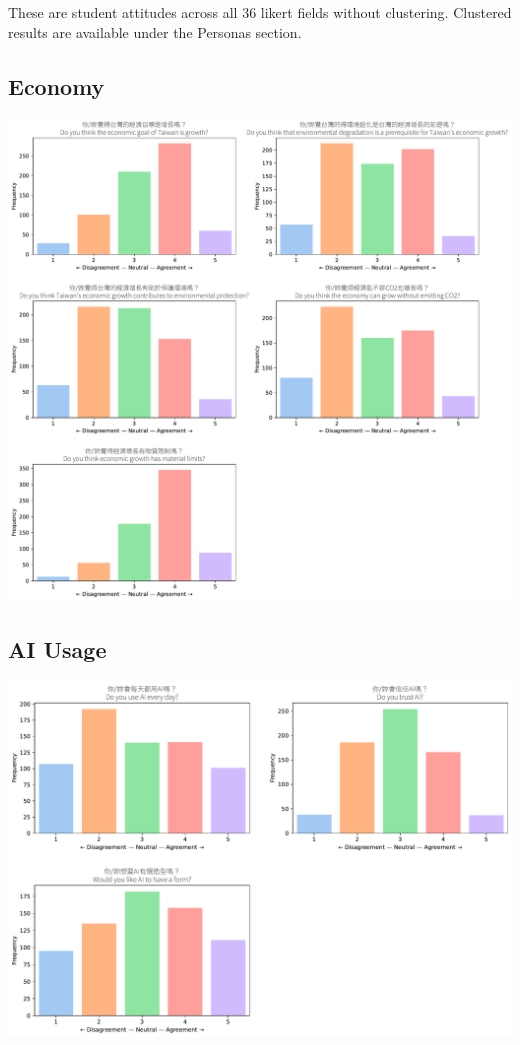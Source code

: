 \documentclass[
  letterpaper,
  DIV=11,
  numbers=noendperiod]{scrartcl}
\begin{document}
These are student attitudes across all 36 likert fields without
clustering. Clustered results are available under the Personas section.

\subsection{Economy}\label{economy}

\includegraphics{_thesis_files/figure-pdf/cell-71-output-1.pdf}

\subsection{AI Usage}\label{ai-usage}

\includegraphics{_thesis_files/figure-pdf/cell-72-output-1.pdf}
\end{document}
